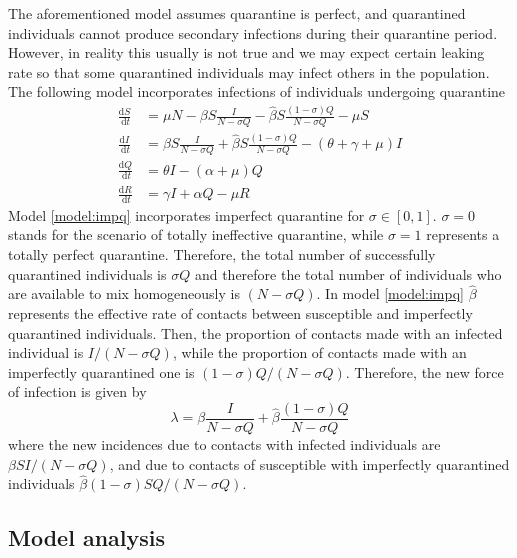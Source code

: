 \documentclass{book}
\begin{document}
The aforementioned model assumes quarantine is perfect, and quarantined individuals cannot produce secondary infections during their quarantine period. However, in reality this usually is not true and we may expect certain leaking rate so that some quarantined individuals may infect others in the population. The following model incorporates infections of individuals undergoing quarantine
%
\begin{equation}
\label{model:impq}
\begin{split}
\frac{\mathrm{d} S}{\mathrm{~d} t} &=\mu N-\beta S \frac{I}{N-\sigma Q}-\hat{\beta} S \frac{(1-\sigma) Q}{N-\sigma Q}-\mu S \\
\frac{\mathrm{d} I}{\mathrm{~d} t} &=\beta S \frac{I}{N-\sigma Q}+\hat{\beta} S \frac{(1-\sigma) Q}{N-\sigma Q}-(\theta+\gamma+\mu) I \\
\frac{\mathrm{d} Q}{\mathrm{~d} t} &=\theta I-(\alpha+\mu) Q \\
\frac{\mathrm{d} R}{\mathrm{~d} t} &=\gamma I+\alpha Q-\mu R
  \end{split}
\end{equation}
%
Model \eqref{model:impq} incorporates imperfect quarantine for $\sigma\in[0,1]$. $\sigma=0$ stands for the scenario of totally ineffective quarantine, while $\sigma=1$ represents a totally perfect quarantine. Therefore, the total number of successfully quarantined individuals is $\sigma Q$ and therefore the total number of individuals who are available to mix homogeneously is $(N-\sigma Q)$.
%
In model \eqref{model:impq} $\hat{\beta}$ represents the effective rate of contacts between susceptible and imperfectly quarantined individuals.
%
Then, the proportion of contacts made with an infected individual is $I /(N-\sigma Q)$, while the proportion of contacts made with an imperfectly quarantined one is $(1-\sigma) Q /(N-\sigma Q)$. 
%
Therefore, the new force of infection is given by
\begin{equation}
\lambda=\beta \frac{I}{N-\sigma Q}+\hat{\beta} \frac{(1-\sigma) Q}{N-\sigma Q}
\end{equation}
%
where the new incidences due to contacts with infected individuals are $\beta S I /(N-\sigma Q)$, and due to contacts of susceptible with imperfectly quarantined individuals $\hat{\beta}(1-\sigma) S Q /(N-\sigma Q)$.

\subsection*{Model analysis}
\end{document}
